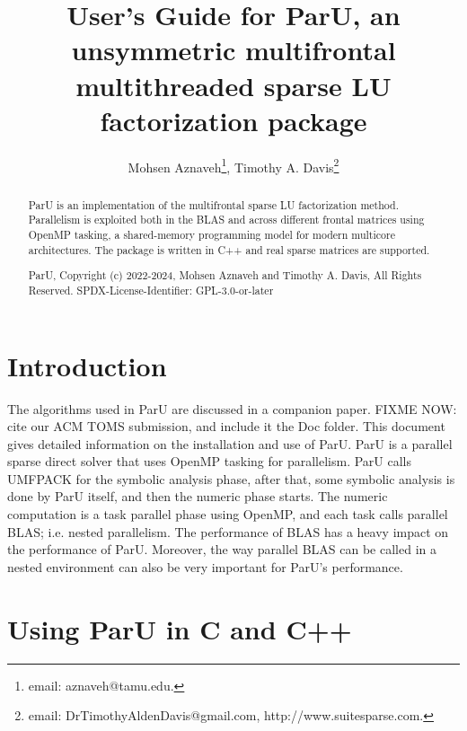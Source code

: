 \documentclass[12pt]{article}
\title{User's Guide for ParU, an unsymmetric multifrontal multithreaded sparse
LU factorization package}
\author{Mohsen Aznaveh\thanks{email: aznaveh@tamu.edu.},
Timothy A. Davis\thanks{email: DrTimothyAldenDavis@gmail.com,
http://www.suitesparse.com.}}
\begin{document}
\maketitle

\begin{abstract}

ParU is an implementation of the multifrontal sparse LU factorization method.
Parallelism is exploited both in the BLAS and across different frontal matrices
using OpenMP tasking, a shared-memory programming model for modern multicore
architectures. The package is written in C++ and real sparse matrices are
supported.

ParU, Copyright (c) 2022-2024, Mohsen Aznaveh and Timothy A. Davis,
All Rights Reserved.
SPDX-License-Identifier: GPL-3.0-or-later
\end{abstract}

\newpage
{\small
\tableofcontents
}

\section{Introduction}
\label{intro}

The algorithms used in ParU are discussed in a companion paper.
FIXME NOW: cite our ACM TOMS submission, and include it the Doc folder.
This document gives detailed information on the installation and use of ParU.
ParU is a parallel sparse direct solver that uses OpenMP tasking for
parallelism. ParU calls UMFPACK for the symbolic analysis phase, after that,
some symbolic analysis is done by ParU itself, and then the numeric phase
starts. The numeric computation is a task parallel phase using OpenMP, and each
task calls parallel BLAS; i.e. nested parallelism.  The performance of BLAS has
a heavy impact on the performance of ParU. Moreover, the way parallel BLAS can
be called in a nested environment can also be very important for ParU's
performance.

\section{Using ParU in C and C++}
\end{document}
